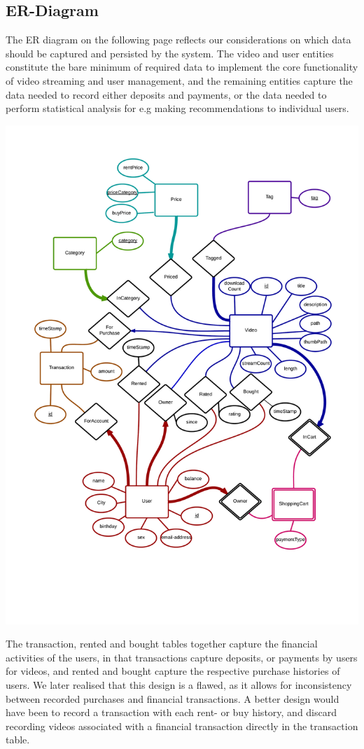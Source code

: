 \subsection{ER-Diagram}
The ER diagram on the following page reflects our considerations on which data should be captured and persisted by the system. The video and user entities constitute the bare minimum of required data to implement the core functionality of video streaming and user management, and the remaining entities capture the data needed to record either deposits and payments, or the data needed to perform statistical analysis for e.g making recommendations to individual users.
\begin{center}
\includegraphics[scale=0.15]{ERDiagram.png}
\end{center}
The transaction, rented and bought tables together capture the financial activities of the users, in that transactions capture deposits, or payments by users for videos, and rented and bought capture the respective purchase histories of users. 
We later realised that this design is a flawed, as it allows for inconsistency between recorded purchases and financial transactions. A better design would have been to record a transaction with each rent- or buy history, and discard recording videos associated with a financial transaction directly in the transaction table.

